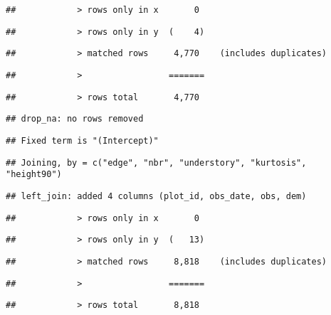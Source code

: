 \documentclass[
]{article}
\begin{document}
\begin{verbatim}
##            > rows only in x       0
\end{verbatim}

\begin{verbatim}
##            > rows only in y  (    4)
\end{verbatim}

\begin{verbatim}
##            > matched rows     4,770    (includes duplicates)
\end{verbatim}

\begin{verbatim}
##            >                 =======
\end{verbatim}

\begin{verbatim}
##            > rows total       4,770
\end{verbatim}

\begin{verbatim}
## drop_na: no rows removed
\end{verbatim}

\begin{verbatim}
## Fixed term is "(Intercept)"
\end{verbatim}

\begin{verbatim}
## Joining, by = c("edge", "nbr", "understory", "kurtosis", "height90")
\end{verbatim}

\begin{verbatim}
## left_join: added 4 columns (plot_id, obs_date, obs, dem)
\end{verbatim}

\begin{verbatim}
##            > rows only in x       0
\end{verbatim}

\begin{verbatim}
##            > rows only in y  (   13)
\end{verbatim}

\begin{verbatim}
##            > matched rows     8,818    (includes duplicates)
\end{verbatim}

\begin{verbatim}
##            >                 =======
\end{verbatim}

\begin{verbatim}
##            > rows total       8,818
\end{verbatim}
\end{document}
